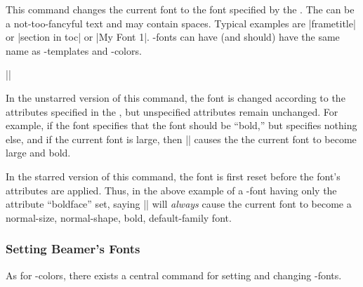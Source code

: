 \begin{command}{\usebeamerfont\opt{|*|}}
  This command changes the current font to the font specified by the
  . The  can be a
  not-too-fancyful text and may contain spaces. Typical examples are
  |frametitle| or |section in toc| or |My Font 1|. \beamer-fonts can
  have (and should) have the same name as \beamer-templates and
  \beamer-colors.

  \example ||

  In the unstarred version of this command, the font is changed
  according to the attributes specified in the , but unspecified attributes remain unchanged. For example, if
  the font specifies that the font should be ``bold,'' but specifies
  nothing else, and if the current font is large, then
  |\usebeamerfont| causes the the current font to become large and
  bold.

  In the starred version of this command, the font is first reset
  before the font's attributes are applied. Thus, in the above example
  of a \beamer-font having only the attribute ``boldface'' set, saying
  |\usebeamerfont*| will \emph{always} cause the current font to
  become a normal-size, normal-shape, bold, default-family font.
\end{command}


\subsubsection{Setting Beamer's Fonts}

As for \beamer-colors, there exists a central command for setting and
changing \beamer-fonts.

